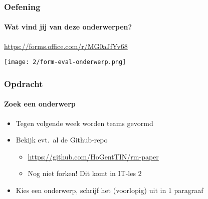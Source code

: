 \documentclass[aspectratio=169]{beamer}
\begin{document}
\begin{frame}
  \frametitle{Oefening}
  \framesubtitle{Wat vind jij van deze onderwerpen?}

  \centering

  \url{https://forms.office.com/r/MG0aJfYv68}

  \bigskip

  \texttt{[image: 2/form-eval-onderwerp.png]}

\end{frame}

\begin{frame}
  \frametitle{Opdracht}
  \framesubtitle{Zoek een onderwerp}

  \begin{itemize}
    \item Tegen volgende week worden teams gevormd
    \item Bekijk evt.\ al de Github-repo
          \begin{itemize}
            \item \url{https://github.com/HoGentTIN/rm-paper}
            \item Nog niet forken! Dit komt in IT-les 2
          \end{itemize}
    \item Kies een onderwerp, schrijf het (voorlopig) uit in 1 paragraaf
  \end{itemize}

\end{frame}
\end{document}
